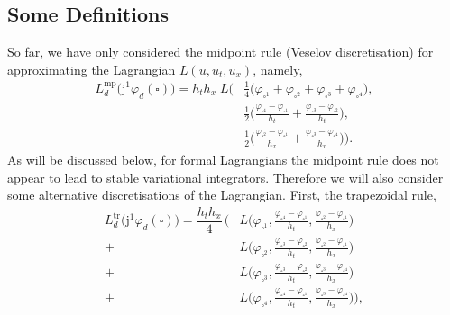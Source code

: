 \documentclass[12pt,a4paper,reqno]{article}
\begin{document}
\subsection{Some Definitions}

So far, we have only considered the midpoint rule (Veselov discretisation) for approximating the Lagrangian $L({\ensuremath{{\ensuremath{{u}}}}}, {\ensuremath{{\ensuremath{{u}}}}}_{t}, {\ensuremath{{\ensuremath{{u}}}}}_{x})$, namely,
\begin{align}\label{eq:applications_discrete_lagrangian_midpoint}
L_{d}^{\mathrm{mp}} \big( {\ensuremath{\mathrm{j}}}^{1} {\ensuremath{\varphi}}_{d} (\square) \big) = h_{t} h_{x} \; L \bigg(
\nonumber
& \tfrac{1}{4} \Big( {\ensuremath{\varphi}}_{\square^{1}} + {\ensuremath{\varphi}}_{\square^{2}} + {\ensuremath{\varphi}}_{\square^{3}} + {\ensuremath{\varphi}}_{\square^{4}} \Big), \\
\nonumber
& \tfrac{1}{2} \Big( \tfrac{{\ensuremath{\varphi}}_{\square^{4}} - {\ensuremath{\varphi}}_{\square^{1}}}{h_{t}} + \tfrac{{\ensuremath{\varphi}}_{\square^{3}} - {\ensuremath{\varphi}}_{\square^{2}}}{h_{t}} \Big), \\
& \tfrac{1}{2} \Big( \tfrac{{\ensuremath{\varphi}}_{\square^{2}} - {\ensuremath{\varphi}}_{\square^{1}}}{h_{x}} + \tfrac{{\ensuremath{\varphi}}_{\square^{3}} - {\ensuremath{\varphi}}_{\square^{4}}}{h_{x}} \Big)
\bigg) .
\end{align}
As will be discussed below, for formal Lagrangians the midpoint rule does not appear to lead to stable variational integrators. Therefore we will also consider some alternative discretisations of the Lagrangian.
First, the trapezoidal rule,
\begin{align}\label{eq:applications_discrete_lagrangian_leapfrog}
L_{d}^{\mathrm{tr}} \big( {\ensuremath{\mathrm{j}}}^{1} {\ensuremath{\varphi}}_{d} (\square) \big) = \dfrac{h_{t} h_{x}}{4} \, \bigg(
\nonumber
  & L \Big( {\ensuremath{\varphi}}_{\square^{1}}, \tfrac{{\ensuremath{\varphi}}_{\square^{4}} - {\ensuremath{\varphi}}_{\square^{1}}}{h_{t}}, \tfrac{{\ensuremath{\varphi}}_{\square^{2}} - {\ensuremath{\varphi}}_{\square^{1}}}{h_{x}} \Big) \\
\nonumber
+ & L \Big( {\ensuremath{\varphi}}_{\square^{2}}, \tfrac{{\ensuremath{\varphi}}_{\square^{3}} - {\ensuremath{\varphi}}_{\square^{2}}}{h_{t}}, \tfrac{{\ensuremath{\varphi}}_{\square^{2}} - {\ensuremath{\varphi}}_{\square^{1}}}{h_{x}} \Big) \\
\nonumber
+ & L \Big( {\ensuremath{\varphi}}_{\square^{3}}, \tfrac{{\ensuremath{\varphi}}_{\square^{3}} - {\ensuremath{\varphi}}_{\square^{2}}}{h_{t}}, \tfrac{{\ensuremath{\varphi}}_{\square^{3}} - {\ensuremath{\varphi}}_{\square^{4}}}{h_{x}} \Big) \\
+ & L \Big( {\ensuremath{\varphi}}_{\square^{4}}, \tfrac{{\ensuremath{\varphi}}_{\square^{4}} - {\ensuremath{\varphi}}_{\square^{1}}}{h_{t}}, \tfrac{{\ensuremath{\varphi}}_{\square^{3}} - {\ensuremath{\varphi}}_{\square^{4}}}{h_{x}} \Big)
\bigg) ,
\end{align}
\end{document}

